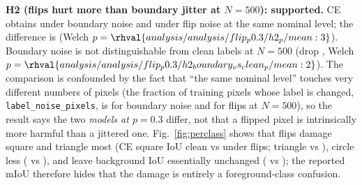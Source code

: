 \textbf{H2 (flips hurt more than boundary jitter at $N=500$): supported.} CE obtains  under boundary noise and  under flip noise at the same nominal level; the difference is  (Welch $p=\rhval{analysis/analysis/flip_p0.3/h2_p/mean:3}$). Boundary noise is not distinguishable from clean labels at $N=500$ (drop , Welch $p=\rhval{analysis/analysis/flip_p0.3/h2_boundary_vs_clean_p/mean:2}$). The comparison is confounded by the fact that ``the same nominal level'' touches very different numbers of pixels (the fraction of training pixels whose label is changed, \texttt{label\_noise\_pixels}, is  for boundary noise and  for flips at $N=500$), so the result says the two \emph{models at $p=0.3$} differ, not that a flipped pixel is intrinsically more harmful than a jittered one. Fig.~\ref{fig:perclass} shows that flips damage square and triangle most (CE square IoU  clean vs  under flips; triangle  vs ), circle less ( vs ), and leave background IoU essentially unchanged ( vs ); the reported mIoU therefore hides that the damage is entirely a foreground-class confusion.

